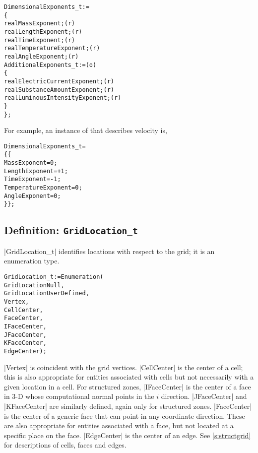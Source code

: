 \begin{alltt}
  DimensionalExponents\_t :=
    \{
    real MassExponent ;                                                     (r)
    real LengthExponent ;                                                   (r)
    real TimeExponent ;                                                     (r)
    real TemperatureExponent ;                                              (r)
    real AngleExponent ;                                                    (r)
    AdditionalExponents\_t :=                                                (o)
      \{
      real ElectricCurrentExponent   ;                                      (r)
      real SubstanceAmountExponent   ;                                      (r)
      real LuminousIntensityExponent ;                                      (r)
      \}
    \} ;
\end{alltt}

For example, an instance of  that describes 
velocity is,

\begin{alltt}
  DimensionalExponents\_t =
    \{\{
    MassExponent        =  0 ;
    LengthExponent      = +1 ;
    TimeExponent        = -1 ;
    TemperatureExponent =  0 ;
    AngleExponent       =  0 ;
    \}\} ;
\end{alltt}

\subsection{Definition: \texttt{GridLocation\_t}}
\label{s:GridLocation}

|GridLocation_t| identifies locations with respect to the grid; it is an
enumeration type.
\begin{alltt}
  GridLocation\_t := Enumeration( 
    GridLocationNull,
    GridLocationUserDefined,
    Vertex,
    CellCenter,
    FaceCenter,
    IFaceCenter,
    JFaceCenter,
    KFaceCenter,
    EdgeCenter ) ;
\end{alltt}
|Vertex| is coincident with the grid vertices.
|CellCenter| is the center of a cell; this is also appropriate for
entities associated with cells but not necessarily with a given
location in a cell.
For structured zones, |IFaceCenter| is the center of a face in 3-D
whose computational normal points in the $i$ direction.
|JFaceCenter| and |KFaceCenter| are similarly defined,
again only for structured zones.
|FaceCenter| is the center of a generic face that can point in any
coordinate direction.
These are also appropriate for entities associated with a face, but not
located at a specific place on the face.
|EdgeCenter| is the center of an edge.
See \autoref{s:structgrid} for descriptions of cells, faces and edges.

